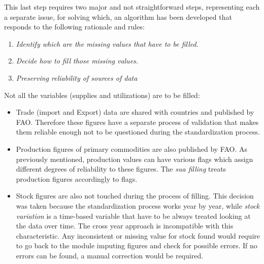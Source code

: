 \documentclass[]{article}
\providecommand{\tightlist}{%
  \setlength{\itemsep}{0pt}\setlength{\parskip}{0pt}}
\begin{document}
This last step requires two major and not straightforward steps,
representing each a separate issue, for solving which, an algorithm has
been developed that responds to the following rationale and rules:

\begin{enumerate}
\def\labelenumi{\arabic{enumi}.}
\tightlist
\item
  \emph{Identify which are the missing values that have to be filled.}
\item
  \emph{Decide how to fill those missing values.}
\item
  \emph{Preserving reliability of sources of data}
\end{enumerate}

Not all the variables (supplies and utilizations) are to be filled:

\begin{itemize}
\tightlist
\item
  Trade (import and Export) data are shared with countries and published
  by FAO. Therefore these figures have a separate process of validation
  that makes them reliable enough not to be questioned during the
  standardization process.
\item
  Production figures of primary commodities are also published by FAO.
  As previously mentioned, production values can have various flags
  which assign different degrees of reliability to these figures. The
  \emph{sua filling} treats production figures accordingly to flags.
\item
  Stock figures are also not touched during the process of filling. This
  decision was taken because the standardization process works year by
  year, while \emph{stock variation} is a time-based variable that have
  to be always treated looking at the data over time. The cross year
  approach is incompatible with this characteristic. Any inconsistent or
  missing value for stock found would require to go back to the module
  imputing figures and check for possible errors. If no errors can be
  found, a manual correction would be required.
\end{itemize}
\end{document}
